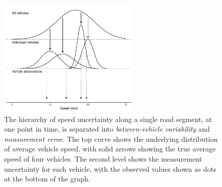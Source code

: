 \begin{knitrout}\small
{}\color{fgcolor}\begin{figure}

{\centering \includegraphics[width=0.6\textwidth]{figure/nw_model_hierarchy-1} 

}

\caption[The hierarchy of speed uncertainty along a single road segment, at one point in time, is separated into \emph{between-vehicle variability} and \emph{measurement error}]{The hierarchy of speed uncertainty along a single road segment, at one point in time, is separated into \emph{between-vehicle variability} and \emph{measurement error}. The top curve shows the underlying distribution of average vehicle speed, with solid arrows showing the true average speed of four vehicles. The second level shows the measurement uncertainty for each vehicle, with the observed values shown as dots at the bottom of the graph.}\label{fig:nw_model_hierarchy}
\end{figure}


\end{knitrout}






